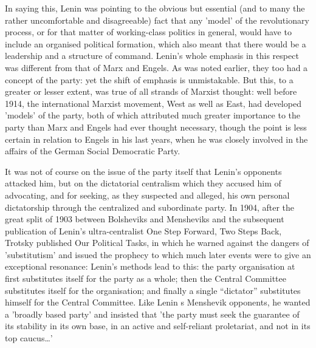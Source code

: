 In saying this, Lenin was pointing to the obvious but essential (and to many the rather uncomfortable and disagreeable) fact that any 'model' of the revolutionary process, or for that matter of working-class politics in general, would have to include an organised political formation, which also meant that there would be a leadership and a structure of command. Lenin's whole emphasis in this respect was different from that of Marx and Engels. As was noted earlier, they too had a concept of the party: yet the shift of emphasis is unmistakable. But this, to a greater or lesser extent, was true of all strands of Marxist thought: well before 1914, the international Marxist movement, West as well as East, had developed 'models' of the party, both of which attributed much greater importance to the party than Marx and Engels had ever thought necessary, though the point is less certain in relation to Engels in his last years, when he was closely involved in the affairs of the German Social Democratic Party.

It was not of course on the issue of the party itself that Lenin's opponents attacked him, but on the dictatorial centralism which they accused him of advocating, and for seeking, as they suspected and alleged, his own personal dictatorship through the centralized and subordinate party. In 1904, after the great split of 1903 between Bolsheviks and Mensheviks and the subsequent publication of Lenin's ultra-centralist One Step Forward, Two Steps Back, Trotsky published Our Political Tasks, in which he warned against the dangers of 'substitutism' and issued the prophecy to which much later events were to give an exceptional resonance: Lenin's methods lead to this: the party organisation at first substitutes itself for the party as a whole; then the Central Committee substitutes itself for the organisation; and finally a single “dictator” substitutes himself for the Central Committee. Like Lenin s Menshevik opponents, he wanted a 'broadly based party' and insisted that 'the party must seek the guarantee of its stability in its own base, in an active and self\hyp{}reliant proletariat, and not in its top caucus\dots{}'

